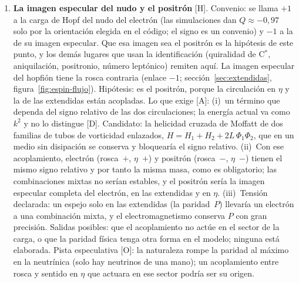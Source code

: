 \documentclass[11pt,a4paper]{article}
\newcommand{\st}[1]{\textup{[#1]}}
\newcommand{\Cst}{C\ensuremath{^{*}}}
\begin{document}
\begin{enumerate}[label=\arabic*.,ref=\arabic*,leftmargin=*]
\st{A}: (i)~calcular las frecuencias de los dos modos y relacionarlas con las masas; como las frecuencias van como la raíz cuadrada de los módulos, una vía es que sus cocientes sean cocientes universales del punto tricrítico, números puros que dependen solo del tipo de transición y no se ajustan; cualquier regla debe reproducir el patrón empírico notable de Koide entre las tres masas \st{O},
\[
\frac{m_e+m_\mu+m_\tau}{\bigl(\sqrt{m_e}+\sqrt{m_\mu}+\sqrt{m_\tau}\bigr)^2}=\frac23 ,
\]
que se cumple con una precisión de 1 entre 100\,000; (ii)~convertir la regla de selección cualitativa de la desintegración en un cálculo del acoplamiento; (iii)~el neutrino tauónico también tiene zonas de mayor índice ($q=-0,6393$), y no se han observado neutrinos pesados: hay que explicar por qué sus zonas de mayor índice no tienen modos excitados observables, quizá porque los modos de compresión y abanico necesitan la interfaz A/\Cst{} y el tauónico vive dentro de \Cst, o porque, con un $q$ fijado por otra condición ($a=0$), sus modos tienen energías o acoplamientos muy distintos.

\item \label{ab:especular}\textbf{La imagen especular del nudo y el positrón} \st{H}. Convenio: se llama $+1$ a la carga de Hopf del nudo del electrón (las simulaciones dan $Q\approx-0{,}97$ solo por la orientación elegida en el código; el signo es un convenio) y $-1$ a la de su imagen especular. Que esa imagen sea el positrón es la hipótesis de este punto, y los demás lugares que usan la identificación (quiralidad de \Cst, aniquilación, positronio, número leptónico) remiten aquí. La imagen especular del hopfión tiene la rosca contraria (enlace $-1$; sección~\ref{sec:extendidas}, figura~\ref{fig:espin-flujo}). Hipótesis: es el positrón, porque la circulación en $\eta$ y la de las extendidas están acopladas. Lo que exige \st{A}: (i)~un término que dependa del signo relativo de las dos circulaciones; la energía actual va como $k^2$ y no lo distingue \st{D}. Candidato: la helicidad cruzada de Moffatt de dos familias de tubos de vorticidad enlazados, $H=H_1+H_2+2L\,\Phi_1\Phi_2$, que en un medio sin disipación se conserva y bloquearía el signo relativo. (ii)~Con ese acoplamiento, electrón (rosca~$+$, $\eta$~$+$) y positrón (rosca~$-$, $\eta$~$-$) tienen el mismo signo relativo y por tanto la misma masa, como es obligatorio; las combinaciones mixtas no serían estables, y el positrón sería la imagen especular completa del electrón, en las extendidas y en $\eta$. (iii)~Tensión declarada: un espejo solo en las extendidas (la paridad~$P$) llevaría un electrón a una combinación mixta, y el electromagnetismo conserva $P$ con gran precisión. Salidas posibles: que el acoplamiento no actúe en el sector de la carga, o que la paridad física tenga otra forma en el modelo; ninguna está elaborada. Pista especulativa \st{O}: la naturaleza rompe la paridad al máximo en la neutrínica (solo hay neutrinos de una mano); un acoplamiento entre rosca y sentido en $\eta$ que actuara en ese sector podría ser su origen.


\end{enumerate}
\end{document}
